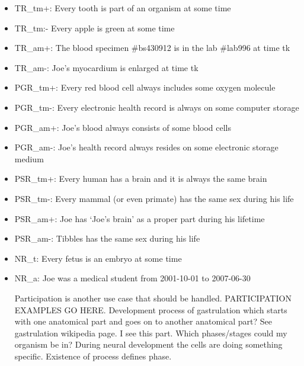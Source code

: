 \begin{itemize}
\item TR\_tm+: Every tooth is part of an organism at some time
\item TR\_tm:- Every apple is green at some time
\item TR\_am+: The blood specimen \#bs430912 is in  the lab \#lab996 at time tk
\item TR\_am-: Joe's myocardium is enlarged at time tk

\item PGR\_tm+: Every red blood cell always includes some oxygen molecule 
\item PGR\_tm-: Every electronic health record is always on some computer storage
\item PGR\_am+: Joe's blood always consists of some blood cells 
\item PGR\_am-: Joe's health record always resides on some electronic storage medium

\item PSR\_tm+: Every human has a brain and it is always the same brain
\item PSR\_tm-: Every mammal (or even primate) has the same sex during his life 
\item PSR\_am+: Joe has `Joe's brain' as a proper part during his lifetime 
\item PSR\_am-: Tibbles has the same sex during his life 

\item NR\_t: Every fetus is an embryo at some time
\item NR\_a: Joe was a medical student from 2001-10-01 to 2007-06-30

Participation is another use case that should be handled. 
PARTICIPATION EXAMPLES GO HERE.
Development process of gastrulation which starts with one anatomical part and goes on to another anatomical part? See gastrulation wikipedia page. 
I see this part. Which phases/stages could my organism be in?
During neural development the cells are doing something specific. Existence of process defines phase.




\end{itemize}



